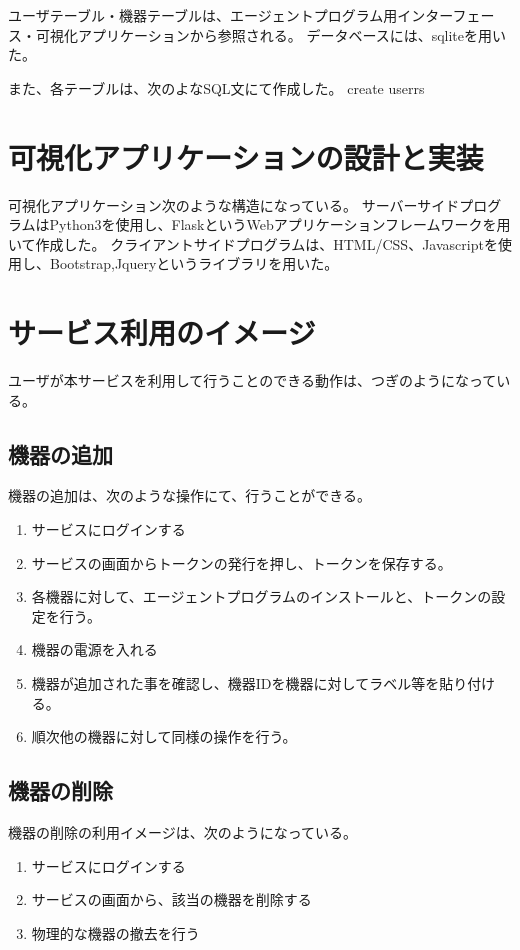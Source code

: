 ユーザテーブル・機器テーブルは、エージェントプログラム用インターフェース・可視化アプリケーションから参照される。
データベースには、sqliteを用いた。

また、各テーブルは、次のよなSQL文にて作成した。
create userrs


\section{可視化アプリケーションの設計と実装}
可視化アプリケーション次のような構造になっている。
サーバーサイドプログラムはPython3を使用し、FlaskというWebアプリケーションフレームワークを用いて作成した。
クライアントサイドプログラムは、HTML/CSS、Javascriptを使用し、Bootstrap,Jqueryというライブラリを用いた。


\section{サービス利用のイメージ}
ユーザが本サービスを利用して行うことのできる動作は、つぎのようになっている。
\subsection{機器の追加}
機器の追加は、次のような操作にて、行うことができる。
\begin{enumerate}
\item サービスにログインする
\item サービスの画面からトークンの発行を押し、トークンを保存する。
\item 各機器に対して、エージェントプログラムのインストールと、トークンの設定を行う。
\item 機器の電源を入れる
\item 機器が追加された事を確認し、機器IDを機器に対してラベル等を貼り付ける。
\item 順次他の機器に対して同様の操作を行う。
\end{enumerate}

\subsection{機器の削除}
機器の削除の利用イメージは、次のようになっている。
\begin{enumerate}
\item サービスにログインする
\item サービスの画面から、該当の機器を削除する
\item 物理的な機器の撤去を行う
\end{enumerate}


